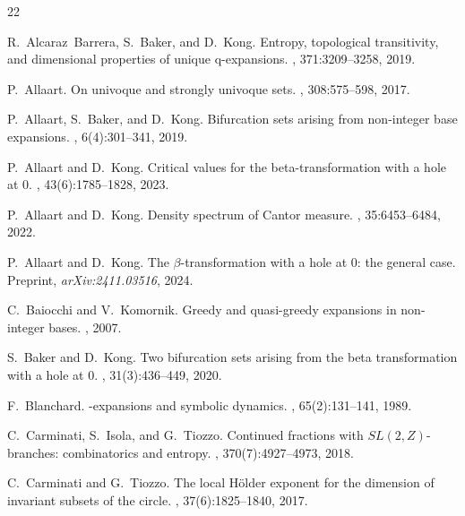 \documentclass[11pt]{amsart}
\theoremstyle{definition}
\theoremstyle{remark}
\numberwithin{equation}{section}
\begin{document}
\begin{thebibliography}{22}

R.~Alcaraz~Barrera, S.~Baker, and D.~Kong.
\newblock Entropy, topological transitivity, and dimensional properties of
  unique q-expansions.
, 371:3209--3258, 2019.

P.~Allaart.
\newblock On univoque and strongly univoque sets.
, 308:575--598, 2017.

P.~Allaart, S.~Baker, and D.~Kong.
\newblock Bifurcation sets arising from non-integer base expansions.
, 6(4):301--341, 2019.

P.~Allaart and D.~Kong.
\newblock Critical values for the beta-transformation with a hole at 0.
, 43(6):1785--1828, 2023.

P.~Allaart and D.~Kong.
\newblock Density spectrum of Cantor measure.
, 35:6453--6484, 2022.

{
P.~Allaart and D.~Kong.
\newblock The $\beta$-transformation with a hole at $0$: the general case.
\newblock Preprint, {\em arXiv:2411.03516}, 2024.
}

C.~Baiocchi and V.~Komornik.
\newblock Greedy and quasi-greedy expansions in non-integer bases.
, 2007.

S.~Baker and D.~Kong.
\newblock Two bifurcation sets arising from the beta transformation with a hole at 0.
, 31(3):436--449, 2020.

F.~Blanchard.
\newblock {$\beta$}-expansions and symbolic dynamics.
, 65(2):131--141, 1989.

C.~Carminati, S.~Isola, and G.~Tiozzo.
\newblock Continued fractions with {$SL(2,Z)$}-branches: combinatorics and entropy.
, 370(7):4927--4973, 2018.

C.~Carminati and G.~Tiozzo.
\newblock The local {H}\"{o}lder exponent for the dimension of invariant
  subsets of the circle.
, 37(6):1825--1840, 2017.


\end{thebibliography}
\end{document}
